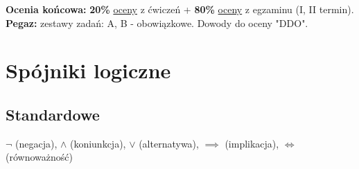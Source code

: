 \documentclass[a5paper,8pt]{article}
\theoremstyle{mythmstyle}
\begin{document}
        \textbf{Ocenia końcowa: } \textbf{20\%} \underline{oceny} z ćwiczeń + \textbf{80\%} \underline{oceny} z egzaminu (I, II termin).\\

        \textbf{Pegaz: } zestawy zadań: A, B - obowiązkowe. Dowody do oceny "DDO".


    \section{Spójniki logiczne} %
    \label{sec:spójniki_logiczne}

        \subsection{Standardowe} %
        \label{sub:standardowe}
            $\neg$ (negacja), $\wedge$ (koniunkcja), $\vee$ (alternatywa), $\implies$ (implikacja), $\iff$ (równoważność)
\end{document}
